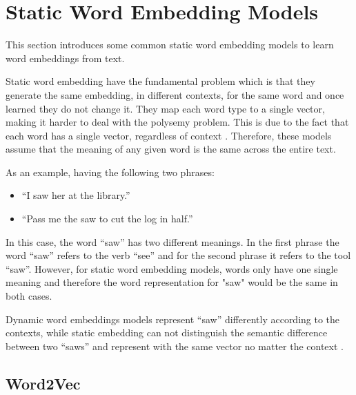     \section{Static Word Embedding Models}
    \label{sec:static}

    \par This section introduces some common static word embedding models to learn word embeddings from text.


    \par Static word embedding have the fundamental problem which is that they generate the same embedding, in different contexts, for the same word and once learned they do not change it. They map each word type to a single vector, making it harder to deal with the polysemy problem. This is due to the fact that each word has a single vector, regardless of context \cite{Mikolov2013}. Therefore, these models assume that the meaning of any given word is the same across the entire text.
   

    \par As an example, having the following two phrases:

    \begin{itemize}
        \item ``I saw her at the library.”
        \item ``Pass me the saw to cut the log in half.”
    \end{itemize}

    \par In this case, the word ``saw” has two different meanings. In the first phrase the word ``saw” refers to the verb ``see” and for the second phrase it refers to the tool ``saw”. However, for static word embedding models, words only have one single meaning and therefore  the word representation for "saw" would be the same in both cases.

    Dynamic word embeddings models represent ``saw” differently according to the contexts, while static embedding can not distinguish the semantic difference between two ``saws” and represent with the same vector no matter the context \cite{Wang2020} \cite{Batista2018}.

   
        \subsection{Word2Vec}

